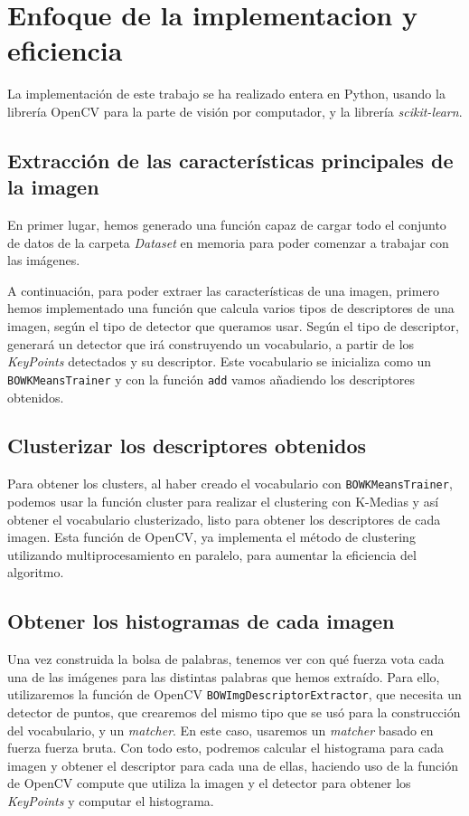 \documentclass[paper=a4, fontsize=11pt]{article} %
\numberwithin{equation}{section} %
\numberwithin{figure}{section} %
\numberwithin{table}{section} %
\begin{document}
\section{Enfoque de la implementacion y eficiencia}

La implementación de este trabajo se ha realizado entera en Python, usando la librería OpenCV para la parte de visión por computador, y la librería \textit{scikit-learn}\cite{scikit-learn}.

\subsection{Extracción de las características principales de la imagen}

En primer lugar, hemos generado una función capaz de cargar todo el conjunto de datos de la carpeta \textit{Dataset} en memoria para poder comenzar a trabajar con las imágenes.

A continuación, para poder extraer las características de una imagen, primero hemos implementado una función que calcula varios tipos de descriptores de una imagen, según el tipo de detector que queramos usar. Según el tipo de descriptor, generará un detector que irá construyendo un vocabulario, a partir de los \textit{KeyPoints} detectados y su descriptor.
Este vocabulario se inicializa como un \texttt{BOWKMeansTrainer} y con la función \texttt{add} vamos añadiendo los descriptores obtenidos.

\subsection{Clusterizar los descriptores obtenidos}

Para obtener los clusters, al haber creado el vocabulario con \texttt{BOWKMeansTrainer}, podemos usar la función cluster para realizar el clustering con K-Medias y así obtener el vocabulario clusterizado, listo para obtener los descriptores de cada imagen.
Esta función de OpenCV, ya implementa el método de clustering utilizando multiprocesamiento en paralelo, para aumentar la eficiencia del algoritmo.

\subsection{Obtener los histogramas de cada imagen}

Una vez construida la bolsa de palabras, tenemos ver con qué fuerza vota cada una de las imágenes para las distintas palabras que hemos extraído. Para ello, utilizaremos la función de OpenCV \texttt{BOWImgDescriptorExtractor}, que necesita un detector de puntos, que crearemos del mismo tipo que se usó para la construcción del vocabulario, y un \textit{matcher}. En este caso, usaremos un \textit{matcher} basado en fuerza fuerza bruta.
Con todo esto, podremos calcular el histograma para cada imagen y obtener el descriptor para cada una de ellas, haciendo uso de la función de OpenCV compute que utiliza la imagen y el detector para obtener los \textit{KeyPoints} y computar el histograma.
\end{document}
